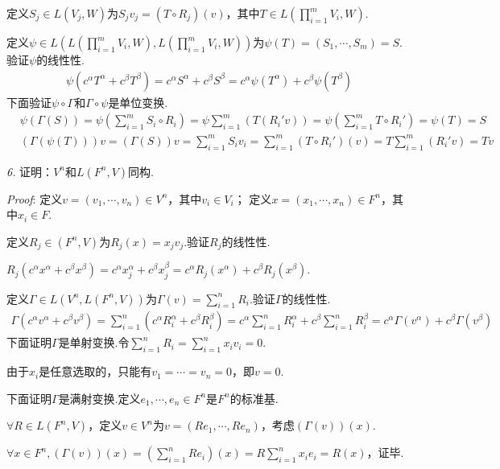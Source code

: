 定义$S_j \in L(V_j,W)$为$S_jv_j=(T \circ R_j)(v)$，其中$T \in L(\prod_{i=1}^m V_i,W)$.

定义$\psi \in L(L(\prod_{i=1}^m V_i,W),L(\prod_{i=1}^m V_i,W))$为$\psi(T)=(S_1,\cdots,S_m)=S$.验证$\psi$的线性性.
    \begin{align*}
        \psi(c^\alpha T^\alpha+c^\beta T^\beta)=c^\alpha S^\alpha+c^\beta S^\beta
        =c^\alpha \psi(T^\alpha)+c^\beta \psi(T^\beta)
    \end{align*}
下面验证$\psi \circ \Gamma$和$\Gamma \circ \psi$是单位变换.
    \begin{align*}
        &\psi(\Gamma(S))=\psi(\sum_{i=1}^m S_i \circ R_i)=\psi \sum_{i=1}^m (T(R_i'v))
        =\psi(\sum_{i=1}^m T \circ R_i')=\psi(T)=S \\
        &(\Gamma(\psi(T)))v=(\Gamma(S))v=\sum_{i=1}^m S_iv_i
        =\sum_{i=1}^m (T \circ R_i')(v)=T\sum_{i=1}^m (R_i'v)=Tv
    \end{align*}

\newpage

\textit{6.}
证明：$V^n$和$L(F^n,V)$同构.

\textit{Proof}:
定义$v=(v_1,\cdots,v_n) \in V^n$，其中$v_i \in V_i$；
定义$x=(x_1,\cdots,x_n) \in F^n$，其中$x_i \in F$.

定义$R_j \in (F^n,V)$为$R_j(x)=x_jv_j$.验证$R_j$的线性性.

$R_j(c^\alpha x^\alpha+c^\beta x^\beta)=c^\alpha x_j^\alpha+c^\beta x_j^\beta
=c^\alpha R_j(x^\alpha)+c^\beta R_j(x^\beta)$.

定义$\Gamma \in L(V^n,L(F^n,V))$为$\Gamma(v)=\sum_{i=1}^n R_i$.验证$\Gamma$的线性性.
    \begin{align*}
        \Gamma(c^\alpha v^\alpha+c^\beta v^\beta)
        =\sum_{i=1}^n (c^\alpha R_i^\alpha+c^\beta R_i^\beta)
        =c^\alpha \sum_{i=1}^n R_i^\alpha+c^\beta \sum_{i=1}^n R_i^\beta
        =c^\alpha \Gamma(v^\alpha)+c^\beta \Gamma(v^\beta)
    \end{align*}
下面证明$\Gamma$是单射变换.令$\sum_{i=1}^n R_i=\sum_{i=1}^n x_iv_i=0$.

由于$x_i$是任意选取的，只能有$v_1=\cdots=v_n=0$，即$v=0$.

下面证明$\Gamma$是满射变换.定义$e_1,\cdots,e_n \in F^n$是$F^n$的标准基.

$\forall R \in L(F^n,V)$，定义$v \in V^n$为$v=(Re_1,\cdots,Re_n)$，考虑$(\Gamma(v))(x)$.

$\forall x \in F^n,(\Gamma(v))(x)=(\sum_{i=1}^n Re_i)(x)=R\sum_{i=1}^n x_ie_i=R(x)$，证毕.

